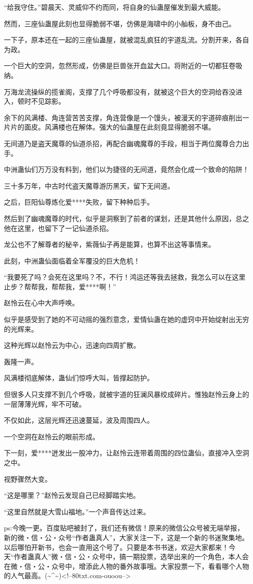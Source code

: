 \begin{this_body}
“给我守住。”碧晨天、灵威仰不约而同，将自身的仙蛊屋催发到最大威能。

然而，三座仙蛊屋此刻也显得脆弱不堪，仿佛是海啸中的小舢板，身不由己。

一下子，原本还在一起的三座仙蛊屋，就被混乱疯狂的宇道乱流。分割开来，各自为政。

一个巨大的空洞，忽然形成，仿佛是巨兽张开血盆大口。将附近的一切都狂卷吸纳。

万海龙流操纵的揽雀阁，支撑了几个呼吸都没有，就被这个巨大的空洞给吞没进入，顿时不见踪影。

余下的风满楼、角连营苦苦支撑，角连营像是一个馒头，被漫天的宇道碎痕削出一片片的面皮。风满楼也在解体。强大的仙蛊屋在此刻竟显得脆弱不堪。

无间道乃是盗天魔尊的仙道杀招，再配合幽魂魔尊的手段，相当于两位魔尊合力出手。

中洲蛊仙们万万没有料到，他们以为捷径的无间道，竟然会化成一个致命的陷阱！

三十多万年，中古时代盗天魔尊游历黑天，留下无间道。

之后，巨阳仙尊炼化爱****失败，留下种种后手。

然后到了幽魂魔尊的时代，似乎是洞察到了前者的谋划，还是其他什么原因，总之他在这里，也留下了一记仙道杀招。

龙公也不了解尊者的秘辛，紫薇仙子再是能算，也算不出这等事情来。

此刻，中洲蛊仙面临着全军覆没的巨大危机！

“我要死了吗？会死在这里吗？不，不行！鸿运还等我去拯救，我怎么可以在这里止步？帮帮我，帮帮我，爱****啊！”

赵怜云在心中大声呼唤。

似乎是感受到了她的不可动摇的强烈意念，爱情仙蛊在她的虚窍中开始绽射出无穷的光辉来。

这种光辉以赵怜云为中心，迅速向四周扩散。

轰隆一声。

风满楼彻底解体，蛊仙们惊呼大叫，皆撑起防护。

但很多人只支撑不到几个呼吸，就被宇道的狂澜风暴绞成碎片。惟独赵怜云身上的一层薄薄光辉，牢不可破。

不仅如此，这层光辉还迅速蔓延，波及周围四人。

一个空洞在赵怜云的眼前形成。

下一刻，爱****迸发出一股冲力，让赵怜云连带着周围的四位蛊仙，直接冲入空洞之中。

视野骤然大变。

“这是哪里？”赵怜云发现自己已经脚踏实地。

“这里自然就是大雪山福地。”一个声音传达过来。

ps:今晚一更。百度贴吧被封了，我们还有微信！原来的微信公众号被无端举报，新的微・信・公・众号“作者蛊真人”，大家关注一下，这是一个新的书迷聚集地。以后哪怕开新书，也会一直用这个号了。只要是本书书迷，欢迎大家都来！今天“作者蛊真人”微・信・公・众号中，搞一期投票，选举出来的一个角色，本人会在微・信・公・众号中，增添此人物的番外故事哦。大家投票一下，看看哪个人物的人气最高。(\~{}\^{}\~{})<!--80txt.com-ouoou-->

\end{this_body}

